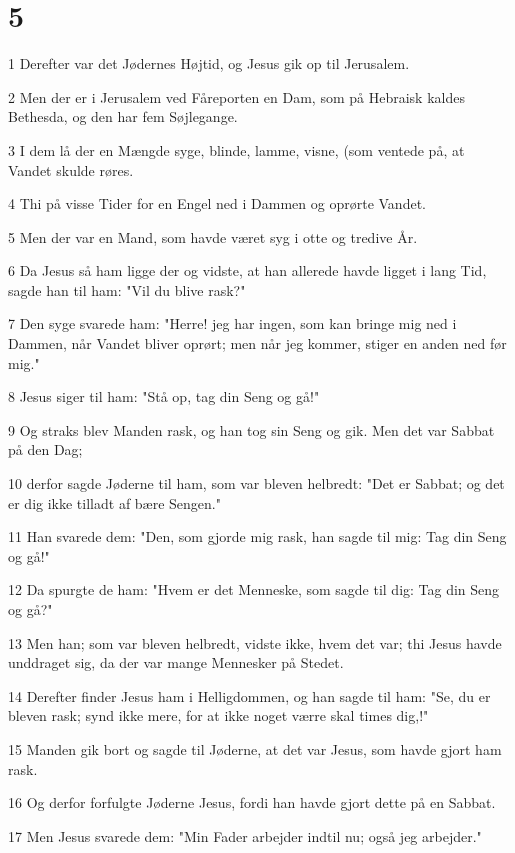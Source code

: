 \chapter{5}

\par 1 Derefter var det Jødernes Højtid, og Jesus gik op til Jerusalem.
\par 2 Men der er i Jerusalem ved Fåreporten en Dam, som på Hebraisk kaldes Bethesda, og den har fem Søjlegange.
\par 3 I dem lå der en Mængde syge, blinde, lamme, visne, (som ventede på, at Vandet skulde røres.
\par 4 Thi på visse Tider for en Engel ned i Dammen og oprørte Vandet.
\par 5 Men der var en Mand, som havde været syg i otte og tredive År.
\par 6 Da Jesus så ham ligge der og vidste, at han allerede havde ligget i lang Tid, sagde han til ham: "Vil du blive rask?"
\par 7 Den syge svarede ham: "Herre! jeg har ingen, som kan bringe mig ned i Dammen, når Vandet bliver oprørt; men når jeg kommer, stiger en anden ned før mig."
\par 8 Jesus siger til ham: "Stå op, tag din Seng og gå!"
\par 9 Og straks blev Manden rask, og han tog sin Seng og gik. Men det var Sabbat på den Dag;
\par 10 derfor sagde Jøderne til ham, som var bleven helbredt: "Det er Sabbat; og det er dig ikke tilladt af bære Sengen."
\par 11 Han svarede dem: "Den, som gjorde mig rask, han sagde til mig: Tag din Seng og gå!"
\par 12 Da spurgte de ham: "Hvem er det Menneske, som sagde til dig: Tag din Seng og gå?"
\par 13 Men han; som var bleven helbredt, vidste ikke, hvem det var; thi Jesus havde unddraget sig, da der var mange Mennesker på Stedet.
\par 14 Derefter finder Jesus ham i Helligdommen, og han sagde til ham: "Se, du er bleven rask; synd ikke mere, for at ikke noget værre skal times dig,!"
\par 15 Manden gik bort og sagde til Jøderne, at det var Jesus, som havde gjort ham rask.
\par 16 Og derfor forfulgte Jøderne Jesus, fordi han havde gjort dette på en Sabbat.
\par 17 Men Jesus svarede dem: "Min Fader arbejder indtil nu; også jeg arbejder."
